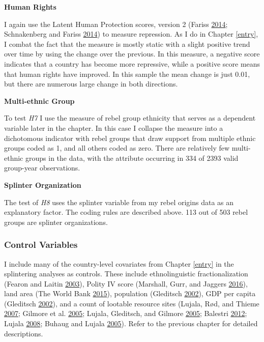 \documentclass[12pt,]{book}
\theoremstyle{definition}
\theoremstyle{definition}
\theoremstyle{remark}
\begin{document}
\textbf{Human Rights}

I again use the Latent Human Protection scores, version 2 (Fariss
\protect\hyperlink{ref-Fariss2014}{2014}; Schnakenberg and Fariss
\protect\hyperlink{ref-Schnakenberg2014}{2014}) to measure repression.
As I do in Chapter \ref{entry}, I combat the fact that the measure is
mostly static with a slight positive trend over time by using the change
over the previous. In this measure, a negative score indicates that a
country has become more repressive, while a positive score means that
human rights have improved. In this sample the mean change is just 0.01,
but there are numerous large change in both directions.

\textbf{Multi-ethnic Group}

To test \emph{H7} I use the measure of rebel group ethnicity that serves
as a dependent variable later in the chapter. In this case I collapse
the measure into a dichotomous indicator with rebel groups that draw
support from multiple ethnic groups coded as 1, and all others coded as
zero. There are relatively few multi-ethnic groups in the data, with the
attribute occurring in 334 of 2393 valid group-year observations.

\textbf{Splinter Organization}

The test of \emph{H8} uses the splinter variable from my rebel origins
data as an explanatory factor. The coding rules are described above. 113
out of 503 rebel groups are splinter organizations.

\subsubsection*{Control Variables}\label{control-variables}

I include many of the country-level covariates from Chapter \ref{entry}
in the splintering analyses as controls. These include ethnolinguistic
fractionalization (Fearon and Laitin
\protect\hyperlink{ref-fearonlaitin03}{2003}), Polity IV score
(Marshall, Gurr, and Jaggers
\protect\hyperlink{ref-Marshall2016}{2016}), land area (The World Bank
\protect\hyperlink{ref-WorldBank2015}{2015}), population (Gleditsch
\protect\hyperlink{ref-Gleditsch2002b}{2002}), GDP per capita (Gleditsch
\protect\hyperlink{ref-Gleditsch2002b}{2002}), and a count of lootable
resource sites (Lujala, Rød, and Thieme
\protect\hyperlink{ref-Lujala2007}{2007}; Gilmore et al.
\protect\hyperlink{ref-Gilmore2007}{2005}; Lujala, Gleditsch, and
Gilmore \protect\hyperlink{ref-Lujala2005}{2005}; Balestri
\protect\hyperlink{ref-Balestri2012}{2012}; Lujala
\protect\hyperlink{ref-Lujala2008}{2008}; Buhaug and Lujala
\protect\hyperlink{ref-Buhaug2005}{2005}). Refer to the previous chapter
for detailed descriptions.
\end{document}

